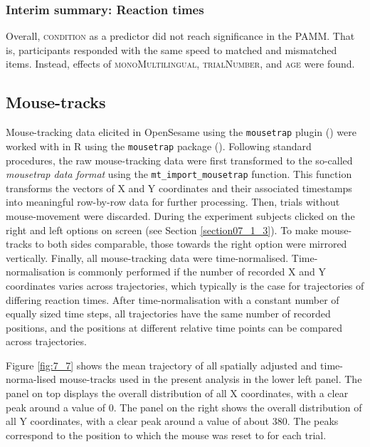 \subsubsection{Interim summary: Reaction times}\label{section07_2_2_4}

Overall, \textsc{condition} as a predictor did not reach significance in the PAMM. That is, participants responded with the same speed to matched and mismatched items. Instead, effects of \textsc{monoMultilingual}, \textsc{trialNumber}, and \textsc{age} were found.

\subsection{Mouse-tracks}\label{section07_2_3}

Mouse-tracking data elicited in OpenSesame using the \texttt{mousetrap} plugin (\cite{Kieslich2017}) were worked with in R using the \texttt{mousetrap} package (\cite{Kieslich2019}). Following standard procedures, the raw mouse-tracking data were first transformed to the so-called \textit{mousetrap data format} using the \texttt{mt\_import\_mousetrap} function. This function transforms the vectors of X and Y coordinates and their associated timestamps into meaningful row-by-row data for further processing. Then, trials without mouse-movement were discarded. During the experiment subjects clicked on the right and left options on screen (see Section \ref{section07_1_3}). To make mouse-tracks to both sides comparable, those towards the right option were mirrored vertically. Finally, all mouse-tracking data were time-normalised. Time-normalisation is commonly performed if the number of recorded X and Y coordinates varies across trajectories, which typically is the case for trajectories of differing reaction times. After time-normalisation with a constant number of equally sized time steps, all trajectories have the same number of recorded positions, and the positions at different relative time points can be compared across trajectories. 

Figure \ref{fig:7_7} shows the mean trajectory of all spatially adjusted and time-norma-lised mouse-tracks used in the present analysis in the lower left panel. The panel on top displays the overall distribution of all X coordinates, with a clear peak around a value of $0$. The panel on the right shows the overall distribution of all Y coordinates, with a clear peak around a value of about $380$. The peaks correspond to the position to which the mouse was reset to for each trial.

